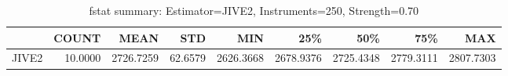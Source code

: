 \begin{table}[ht]
\centering
\caption{fstat summary: Estimator=JIVE2, Instruments=250, Strength=0.70}
\begin{tabular}{lrrrrrrrr}
\toprule
 & COUNT & MEAN & STD & MIN & 25\% & 50\% & 75\% & MAX \\
\midrule
JIVE2 & 10.0000 & 2726.7259 & 62.6579 & 2626.3668 & 2678.9376 & 2725.4348 & 2779.3111 & 2807.7303 \\
\bottomrule
\end{tabular}
\end{table}
